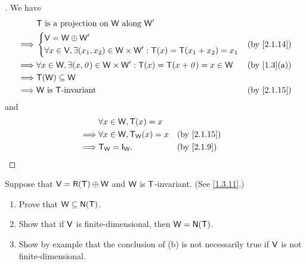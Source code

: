 \begin{proof}[]
	We have
	\begin{align*}
		         & \T \text{ is a projection on } \W \text{ along } \W'                                                   \\
		\implies & \begin{dcases}
			           \V = \W \oplus \W' \\
			           \forall x \in \V, \exists (x_1, x_2) \in \W \times \W' : \T(x) = \T(x_1 + x_2) = x_1
		           \end{dcases}  &  & \by{2.1.14}                    \\
		\implies & \forall x \in \W, \exists (x, \zv) \in \W \times \W' : \T(x) = \T(x + \zv) = x \in \W &  & \by{1.3}[a] \\
		\implies & \T(\W) \subseteq \W                                                                                    \\
		\implies & \W \text{ is } \T\text{-invariant}                                                    &  & \by{2.1.15}
	\end{align*}
	and
	\begin{align*}
		         & \forall x \in \W, \T(x) = x                       \\
		\implies & \forall x \in \W, \T_{\W}(x) = x &  & \by{2.1.15} \\
		\implies & \T_{\W} = \IT[\W].               &  & \by{2.1.9}
	\end{align*}
\end{proof}

\begin{ex}\label{ex:2.1.31}
	Suppose that \(\V = \rg{\T} \oplus \W\) and \(\mathsf{W}\) is \(\mathsf{T}\)-invariant.
	(See \cref{1.3.11}.)
	\begin{enumerate}
		\item Prove that \(\W \subseteq \ns{\T}\).
		\item Show that if \(\mathsf{V}\) is finite-dimensional, then \(\W = \ns{\T}\).
		\item Show by example that the conclusion of (b) is not necessarily true if \(\mathsf{V}\) is not finite-dimensional.
	\end{enumerate}
\end{ex}

